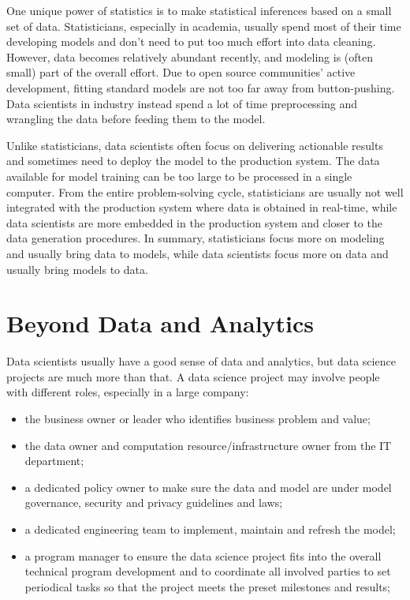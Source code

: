 \documentclass[
  12pt,
]{krantz}
\providecommand{\tightlist}{%
  \setlength{\itemsep}{0pt}\setlength{\parskip}{0pt}}
\begin{document}
One unique power of statistics is to make statistical inferences based on a small set of data. Statisticians, especially in academia, usually spend most of their time developing models and don't need to put too much effort into data cleaning. However, data becomes relatively abundant recently, and modeling is (often small) part of the overall effort. Due to open source communities' active development, fitting standard models are not too far away from button-pushing. Data scientists in industry instead spend a lot of time preprocessing and wrangling the data before feeding them to the model.

Unlike statisticians, data scientists often focus on delivering actionable results and sometimes need to deploy the model to the production system. The data available for model training can be too large to be processed in a single computer. From the entire problem-solving cycle, statisticians are usually not well integrated with the production system where data is obtained in real-time, while data scientists are more embedded in the production system and closer to the data generation procedures. In summary, statisticians focus more on modeling and usually bring data to models, while data scientists focus more on data and usually bring models to data.

\hypertarget{beyond-data-and-analytics}{%
\section{Beyond Data and Analytics}\label{beyond-data-and-analytics}}

Data scientists usually have a good sense of data and analytics, but data science projects are much more than that. A data science project may involve people with different roles, especially in a large company:

\begin{itemize}
\tightlist
\item
  the business owner or leader who identifies business problem and value;
\item
  the data owner and computation resource/infrastructure owner from the IT department;
\item
  a dedicated policy owner to make sure the data and model are under model governance, security and privacy guidelines and laws;
\item
  a dedicated engineering team to implement, maintain and refresh the model;
\item
  a program manager to ensure the data science project fits into the overall technical program development and to coordinate all involved parties to set periodical tasks so that the project meets the preset milestones and results;
\end{itemize}
\end{document}
